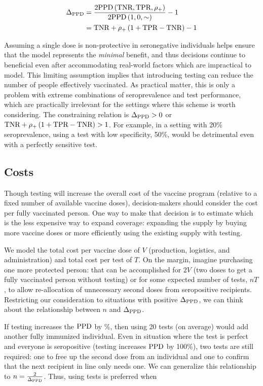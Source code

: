 \documentclass[10pt,a4paper,twocolumn]{article}
\begin{document}
\begin{equation}\label{delppd}
\begin{aligned}
\Delta_{\textrm{PPD}} &= \frac{2\textrm{PPD}\left(\textrm{TNR},\textrm{TPR},\rho_{{+}}\right)}{2\textrm{PPD}\left(1,0,\sim\right)} - 1 \\
&= \textrm{TNR} + \rho_{{+}} \left(1 + \textrm{TPR}-\textrm{TNR}\right) - 1
\end{aligned}
\end{equation}

Assuming a single dose is non-protective in seronegative individuals helps ensure that the model represents the {\em minimal} benefit, and thus decisions continue to beneficial even after accommodating real-world factors which are impractical to model. This limiting assumption implies that introducing testing can reduce the number of people effectively vaccinated. As practical matter, this is only a problem with extreme combinations of seroprevalence and test performance, which are practically irrelevant for the settings where this scheme is worth considering. The constraining relation is $\Delta_{\textrm{PPD}} > 0$ or $\textrm{TNR} + \rho_{{+}} \left(1 + \textrm{TPR}-\textrm{TNR}\right) > 1$. For example, in a setting with 20\% seroprevalence, using a test with low specificity, 50\%, would be detrimental even with a perfectly sensitive test.

\subsection*{Costs}

Though testing will increase the overall cost of the vaccine program (relative to a fixed number of available vaccine doses), decision-makers should consider the cost per fully vaccinated person. One way to make that decision is to estimate which is the less expensive way to expand coverage: expanding the supply by buying more vaccine doses or more efficiently using the existing supply with testing.

We model the total cost per vaccine dose of $V$ (\ie* production, logistics, and administration) and total cost per test of $T$. On the margin, imagine purchasing one more protected person: that can be accomplished for $2V$ (\ie* two doses to get a fully vaccinated person without testing) or for some expected number of tests, $nT$, to allow re-allocation of unnecessary second doses from seropositive recipients. Restricting our consideration to situations with positive $\Delta_{\textrm{PPD}}$, we can think about the relationship between $n$ and $\Delta_{\textrm{PPD}}$.

If testing increases the $\textrm{PPD}$ by \%, then using 20 tests (on average) would add another fully immunized individual. Even in situation where the test is perfect and everyone is seropositive (\ie* testing increases $\textrm{PPD}$ by 100\%), two tests are still required: one to free up the second dose from an individual and one to confirm that the next recipient in line only needs one. We can generalize this relationship to $n = \frac{2}{\Delta_{\textrm{PPD}}}$. Thus, using tests is preferred when
\end{document}
